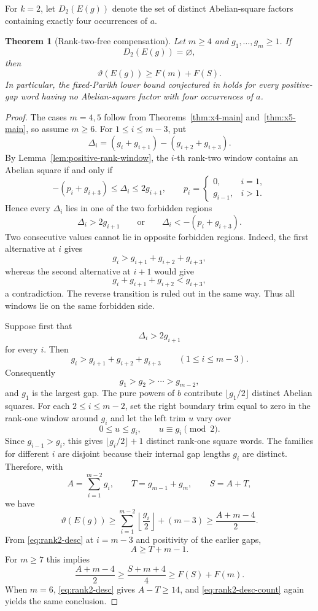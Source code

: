 \documentclass[11pt]{article}
\newtheorem{theorem}{Theorem}[section]
\theoremstyle{definition}
\newcommand{\thetaas}{\vartheta}
\begin{document}
For $k=2$, let $D_2(E(g))$ denote the set of distinct Abelian-square factors containing exactly four occurrences of $a$.

\begin{theorem}[Rank-two-free compensation]\label{thm:rank-two-free}
Let $m\ge4$ and $g_1,\ldots,g_m\ge1$.  If
\[
 D_2(E(g))=\varnothing,
\]
then
\[
 \thetaas(E(g))\ge F(m)+F(S).
\]
In particular, the fixed-Parikh lower bound conjectured in \cite{FMMS2026} holds for every positive-gap word having no Abelian-square factor with four occurrences of $a$.
\end{theorem}

\begin{proof}
The cases $m=4,5$ follow from Theorems~\ref{thm:x4-main} and~\ref{thm:x5-main}, so assume $m\ge6$.
For $1\le i\le m-3$, put
\[
 \Delta_i=(g_i+g_{i+1})-(g_{i+2}+g_{i+3}).
\]
By Lemma~\ref{lem:positive-rank-window}, the $i$-th rank-two window contains an Abelian square if and only if
\[
 -(p_i+g_{i+3})\le\Delta_i\le2g_{i+1},
 \qquad
 p_i=\begin{cases}0,&i=1,\\ g_{i-1},&i>1.\end{cases}
\]
Hence every $\Delta_i$ lies in one of the two forbidden regions
\[
 \Delta_i>2g_{i+1}
 \qquad\text{or}\qquad
 \Delta_i<-(p_i+g_{i+3}).
\]
Two consecutive values cannot lie in opposite forbidden regions.  Indeed, the first alternative at $i$ gives
\[
 g_i>g_{i+1}+g_{i+2}+g_{i+3},
\]
whereas the second alternative at $i+1$ would give
\[
 g_i+g_{i+1}+g_{i+2}<g_{i+3},
\]
a contradiction.  The reverse transition is ruled out in the same way.  Thus all windows lie on the same forbidden side.

Suppose first that
\[
 \Delta_i>2g_{i+1}
\]
for every $i$.  Then
\begin{equation}\label{eq:rank2-desc}
 g_i>g_{i+1}+g_{i+2}+g_{i+3}
 \qquad(1\le i\le m-3).
\end{equation}
Consequently
\[
 g_1>g_2>\cdots>g_{m-2},
\]
and $g_1$ is the largest gap.  The pure powers of $b$ contribute $\lfloor g_1/2\rfloor$ distinct Abelian squares.  For each $2\le i\le m-2$, set the right boundary trim equal to zero in the rank-one window around $g_i$ and let the left trim $u$ vary over
\[
 0\le u\le g_i,\qquad u\equiv g_i\pmod2.
\]
Since $g_{i-1}>g_i$, this gives $\lfloor g_i/2\rfloor+1$ distinct rank-one square words.  The families for different $i$ are disjoint because their internal gap lengths $g_i$ are distinct.  Therefore, with
\[
 A=\sum_{i=1}^{m-2}g_i,\qquad
 T=g_{m-1}+g_m,\qquad S=A+T,
\]
we have
\begin{equation}\label{eq:rank2-desc-count}
 \thetaas(E(g))
 \ge
 \sum_{i=1}^{m-2}\left\lfloor\frac{g_i}{2}\right\rfloor+(m-3)
 \ge \frac{A+m-4}{2}.
\end{equation}
From \eqref{eq:rank2-desc} at $i=m-3$ and positivity of the earlier gaps,
\[
 A\ge T+m-1.
\]
For $m\ge7$ this implies
\[
 \frac{A+m-4}{2}
 \ge \frac{S+m+4}{4}
 \ge F(S)+F(m).
\]
When $m=6$, \eqref{eq:rank2-desc} gives $A-T\ge14$, and \eqref{eq:rank2-desc-count} again yields the same conclusion.


\end{proof}
\end{document}
